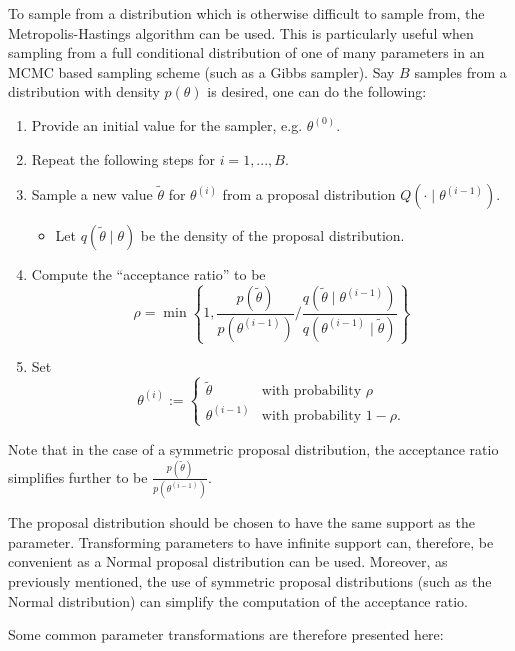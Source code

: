\documentclass[12pt,]{article}
\providecommand{\tightlist}{%
  \setlength{\itemsep}{0pt}\setlength{\parskip}{0pt}}
\newcommand{\bc}[1]{ \left\{#1\right\} }
\begin{document}
To sample from a distribution which is otherwise difficult to sample
from, the Metropolis-Hastings algorithm can be used. This is
particularly useful when sampling from a full conditional distribution
of one of many parameters in an MCMC based sampling scheme (such as a
Gibbs sampler). Say \(B\) samples from a distribution with density
\(p(\theta)\) is desired, one can do the following:

\begin{enumerate}
\def\labelenumi{\arabic{enumi}.}
\tightlist
\item
  Provide an initial value for the sampler, e.g. \(\theta^{(0)}\).
\item
  Repeat the following steps for \(i = 1,...,B\).
\item
  Sample a new value \(\tilde\theta\) for \(\theta^{(i)}\) from a
  proposal distribution \(Q(\cdot \mid \theta^{(i-1)})\).

  \begin{itemize}
  \tightlist
  \item
    Let \(q(\tilde\theta \mid \theta)\) be the density of the proposal
    distribution.
  \end{itemize}
\item
  Compute the ``acceptance ratio'' to be \[
     \rho=
     \min\bc{1, \frac{p(\tilde\theta)}{p(\theta^{(i-1)})} \Big/ 
            \frac{q(\tilde\theta\mid\theta^{(i-1)})}
                 {q(\theta^{(i-1)}\mid\tilde\theta)}
        }
     \]
\item
  Set \[
     \theta^{(i)} := 
     \begin{cases}
     \tilde\theta &\text{with probability } \rho \\
     \theta^{(i-1)} &\text{with probability } 1-\rho.
     \end{cases}
     \]
\end{enumerate}

Note that in the case of a symmetric proposal distribution, the
acceptance ratio simplifies further to be
\(\frac{p(\tilde\theta)}{p(\theta^{(i-1)})}\).

The proposal distribution should be chosen to have the same support as
the parameter. Transforming parameters to have infinite support can,
therefore, be convenient as a Normal proposal distribution can be used.
Moreover, as previously mentioned, the use of symmetric proposal
distributions (such as the Normal distribution) can simplify the
computation of the acceptance ratio.

Some common parameter transformations are therefore presented here:
\end{document}
